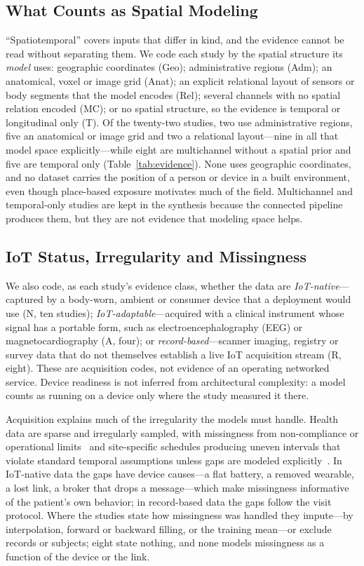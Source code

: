 \documentclass[journal]{IEEEtran}
\begin{document}
\subsection{What Counts as Spatial Modeling}
\label{sec:spatial}
``Spatiotemporal'' covers inputs that differ in kind, and the evidence cannot be read without separating them. We code each study by the spatial structure its \emph{model} uses: geographic coordinates (Geo); administrative regions (Adm); an anatomical, voxel or image grid (Anat); an explicit relational layout of sensors or body segments that the model encodes (Rel); several channels with no spatial relation encoded (MC); or no spatial structure, so the evidence is temporal or longitudinal only (T). Of the twenty-two studies, two use administrative regions, five an anatomical or image grid and two a relational layout---nine in all that model space explicitly---while eight are multichannel without a spatial prior and five are temporal only (Table~\ref{tab:evidence}). None uses geographic coordinates, and no dataset carries the position of a person or device in a built environment, even though place-based exposure motivates much of the field. Multichannel and temporal-only studies are kept in the synthesis because the connected pipeline produces them, but they are not evidence that modeling space helps.

\subsection{IoT Status, Irregularity and Missingness}
\label{sec:iotstatus}
We also code, as each study's evidence class, whether the data are \emph{IoT-native}---captured by a body-worn, ambient or consumer device that a deployment would use (N, ten studies); \emph{IoT-adaptable}---acquired with a clinical instrument whose signal has a portable form, such as electroencephalography (EEG) or magnetocardiography (A, four); or \emph{record-based}---scanner imaging, registry or survey data that do not themselves establish a live IoT acquisition stream (R, eight). These are acquisition codes, not evidence of an operating networked service. Device readiness is not inferred from architectural complexity: a model counts as running on a device only where the study measured it there.

Acquisition explains much of the irregularity the models must handle. Health data are sparse and irregularly sampled, with missingness from non-compliance or operational limits~\cite{che2018grud} and site-specific schedules producing uneven intervals that violate standard temporal assumptions unless gaps are modeled explicitly~\cite{shukla2021irregular}. In IoT-native data the gaps have device causes---a flat battery, a removed wearable, a lost link, a broker that drops a message---which make missingness informative of the patient's own behavior; in record-based data the gaps follow the visit protocol. Where the studies state how missingness was handled they impute---by interpolation, forward or backward filling, or the training mean---or exclude records or subjects; eight state nothing, and none models missingness as a function of the device or the link.
\end{document}
